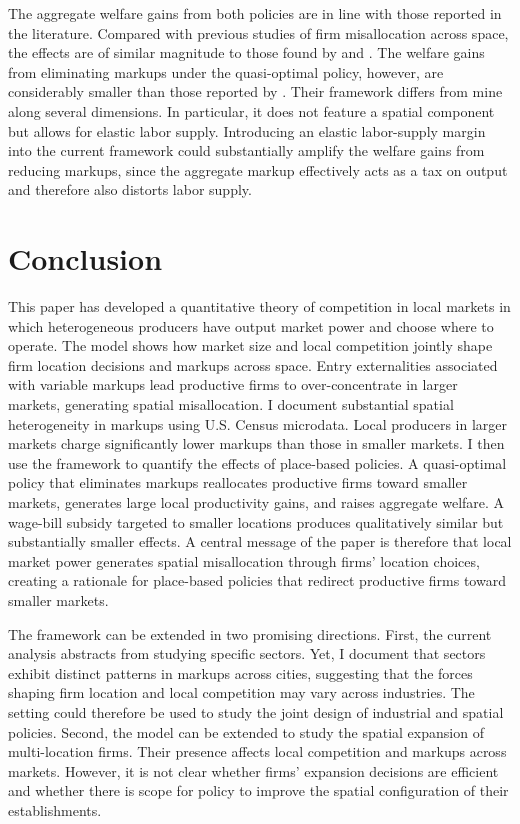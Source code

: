 The aggregate welfare gains from both policies are in line with those reported in the literature. Compared with previous studies of firm misallocation across space, the effects are of similar magnitude to those found by \textcite{Gaubert18} and \textcite{Bilal23}. The welfare gains from eliminating markups under the quasi-optimal policy, however, are considerably smaller than those reported by \textcite{EdmondMidrigan&Xu23}. Their framework differs from mine along several dimensions. In particular, it does not feature a spatial component but allows for elastic labor supply. Introducing an elastic labor-supply margin into the current framework could substantially amplify the welfare gains from reducing markups, since the aggregate markup effectively acts as a tax on output and therefore also distorts labor supply.

\section{Conclusion}\label{s:conc}
This paper has developed a quantitative theory of competition in local markets in which heterogeneous producers have output market power and choose where to operate. The model shows how market size and local competition jointly shape firm location decisions and markups across space. Entry externalities associated with variable markups lead productive firms to over-concentrate in larger markets, generating spatial misallocation. I document substantial spatial heterogeneity in markups using U.S. Census microdata. Local producers in larger markets charge significantly lower markups than those in smaller markets. I then use the framework to quantify the effects of place-based policies. A quasi-optimal policy that eliminates markups reallocates productive firms toward smaller markets, generates large local productivity gains, and raises aggregate welfare. A wage-bill subsidy targeted to smaller locations produces qualitatively similar but substantially smaller effects. A central message of the paper is therefore that local market power generates spatial misallocation through firms’ location choices, creating a rationale for place-based policies that redirect productive firms toward smaller markets.

The framework can be extended in two promising directions. First, the current analysis abstracts from studying specific sectors. Yet, I document that sectors exhibit distinct patterns in markups across cities, suggesting that the forces shaping firm location and local competition may vary across industries. The setting could therefore be used to study the joint design of industrial and spatial policies. Second, the model can be extended to study the spatial expansion of multi-location firms. Their presence affects local competition and markups across markets. However, it is not clear whether firms’ expansion decisions are efficient and whether there is scope for policy to improve the spatial configuration of their establishments.



